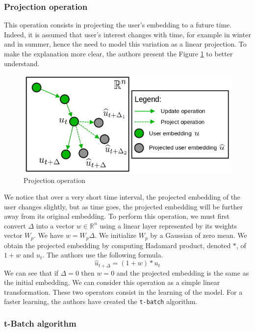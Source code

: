 \subsubsection{Projection operation}

This operation consists in projecting the user's embedding to a future time. Indeed, it is assumed that user's interest changes with time, for example in winter and in summer, hence the need to model this variation as a linear projection. To make the explanation more clear, the authors present the Figure \ref{Projection} to better understand.\\

\begin{figure}[H]
    \centering
    \includegraphics[scale = 0.4]{image/projection_operation.png}
    \caption{Projection operation}
   \label{Projection}
\end{figure}

We notice that over a very short time interval, the projected embedding of the user changes slightly, but as time goes, the projected embedding will be further away from its original embedding. To perform this operation, we must first convert $\Delta$ into a vector $w \in \mathbb{R}^n$ using a linear layer represented by its weights vector $W_p$. We have $w = W_p \Delta$. We initialize $W_p$ by a Gaussian of zero mean. We obtain the projected embedding by computing Hadamard product, denoted $*$, of $1+w$ and $u_t$. The authors use the following formula.
$$
\widehat u_{t+\Delta} = (1+w) * u_t
$$
We can see that if $\Delta = 0$ then $w=0$ and the projected embedding is the same as the initial embedding. We can consider this operation as a simple linear transformation. These two operators consist in the learning of the model. For a faster learning, the authors have created the \texttt{t-batch} algorithm.

\subsubsection{t-Batch algorithm}

